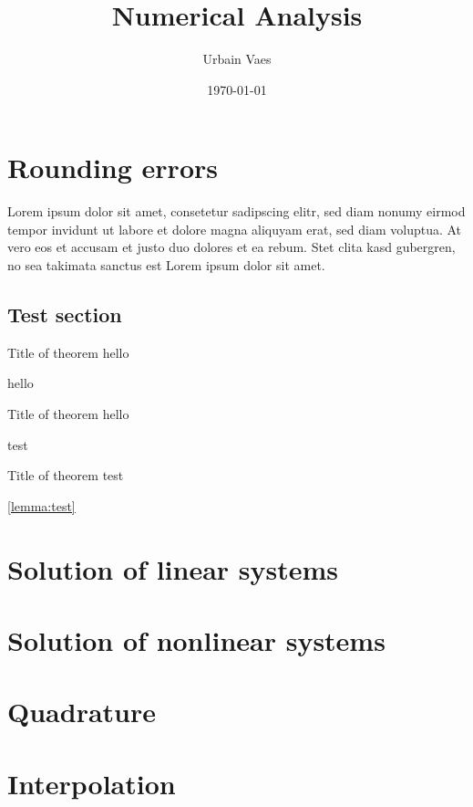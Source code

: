 \documentclass{report}
\title{Numerical Analysis}
\author{Urbain Vaes}
\date{\today}
\begin{document}
\maketitle

\chapter{Rounding errors}%
\label{cha:rounding_errors}


Lorem ipsum dolor sit amet, consetetur sadipscing elitr, sed diam nonumy eirmod tempor invidunt ut labore et dolore magna aliquyam erat, sed diam voluptua. At vero eos et accusam et justo duo dolores et ea rebum. Stet clita kasd gubergren, no sea takimata sanctus est Lorem ipsum dolor sit amet.

\section{Test section}%
\label{sec:test_section}

\begin{theorem}
    {Title of theorem}
    \label{thm:test}
    hello
\end{theorem}

\begin{example}
    hello
\end{example}

\begin{lemma}
    {Title of theorem}
    \label{lemma:test}
    hello
\end{lemma}

\begin{remark}
    [Hello]
    test
\end{remark}

\begin{theorem}
    {Title of theorem}
    test
\end{theorem}

\cref{lemma:test}

\chapter{Solution of linear systems}
\label{cha:solution_of_linear_systems}

\chapter{Solution of nonlinear systems}
\label{cha:solution_of_nonlinear_systems}

\chapter{Quadrature}
\label{cha:quadrature}

\chapter{Interpolation}
\label{cha:interpolation}
\end{document}
